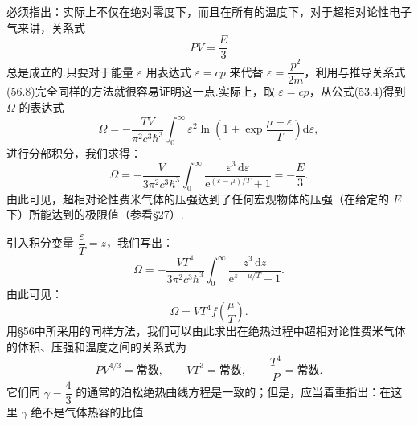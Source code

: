 必须指出：实际上不仅在绝对零度下，而且在所有的温度下，对于超相对论性电子气来讲，关系式
\begin{equation}
  PV=\frac{E}{3}
\end{equation}
总是成立的.只要对于能量 $\varepsilon$ 用表达式 $\varepsilon=cp$ 来代替 $\varepsilon=\dfrac{p^2}{2m}$，利用与推导关系式(56.8)完全同样的方法就很容易证明这一点.实际上，取 $\varepsilon=cp$，从公式(53.4)得到 $\Omega$ 的表达式
\begin{equation*}
  \Omega=-\frac{TV}{\pi^2c^3\hbar^3}\int_0^{\infty}
  \varepsilon^2\ln\left(1+\exp\frac{\mu-\varepsilon}{T}\right)\mathrm{d}\varepsilon,
\end{equation*}
进行分部积分，我们求得：
\begin{equation}
  \Omega=-\frac{V}{3\pi^2c^3\hbar^3}\int_0^{\infty}
  \frac{\varepsilon^3\,\mathrm{d}\varepsilon}{\mathrm{e}^{(\varepsilon-\mu)/T}+1}
  =-\frac{E}{3}.
\end{equation}
由此可见，超相对论性费米气体的压强达到了任何宏观物体的压强（在给定的 $E$ 下）所能达到的极限值（参看§27）.

引入积分变量 $\dfrac{\varepsilon}{T}=z$，我们写出：
\begin{equation*}
  \Omega=-\frac{VT^4}{3\pi^2c^3\hbar^3}
  \int_0^{\infty}\frac{z^3\,\mathrm{d}z}{\mathrm{e}^{z-\mu/T}+1}.
\end{equation*}
由此可见：
\begin{equation}
  \Omega=VT^4f\left(\frac{\mu}{T}\right).
\end{equation}
用§56中所采用的同样方法，我们可以由此求出在绝热过程中超相对论性费米气体的体积、压强和温度之间的关系式为
\begin{equation}
  PV^{4/3}=\text{常数},\qquad VT^3=\text{常数},\qquad
  \frac{T^4}{P}=\text{常数}.
\end{equation}
它们同 $\gamma=\dfrac{4}{3}$ 的通常的泊松绝热曲线方程是一致的；但是，应当着重指出：在这里 $\gamma$ 绝不是气体热容的比值.

